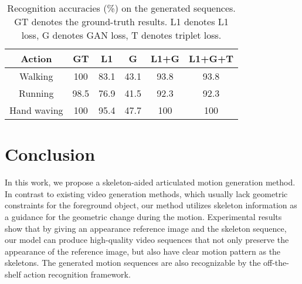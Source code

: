 \documentclass[journal]{IEEEtran}
\begin{document}
\begin{table}[]
\centering
\caption{Recognition accuracies (\%) on the generated sequences. GT denotes the ground-truth results. L1 denotes L1 loss, G denotes GAN loss, T denotes triplet loss.}
\label{table:accuracy}
\begin{tabular}{c|c|c|c|c|c}
\hline \hline
Action      & GT  & L1 & G  & L1+G & L1+G+T \\ \hline
Walking     & 100 & 83.1 & 43.1 & 93.8   & 93.8     \\
Running     & 98.5  & 76.9 & 41.5 & 92.3   & 92.3     \\
Hand waving & 100 & 95.4 & 47.7 & 100  & 100    \\ \hline \hline
\end{tabular}
\end{table}

\section{Conclusion}
In this work, we propose a skeleton-aided articulated motion generation method. In contrast to existing video generation methods, which usually lack geometric constraints for the foreground object, our method utilizes skeleton information as a guidance for the geometric change during the motion.
Experimental results show that by giving an appearance reference image and the skeleton sequence, our model can produce high-quality video sequences that not only preserve the appearance of the reference image, but also have clear motion pattern as the skeletons. The generated motion sequences are also recognizable by the off-the-shelf action recognition framework.









\end{document}
